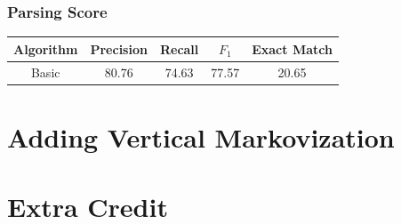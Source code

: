 \documentclass[12pt]{article}
\begin{document}
\subsubsection{Parsing Score}
\begin{center}
\begin{tabular}{|c|c|c|c|c|}
\hline
Algorithm & Precision & Recall & $F_1$ & Exact Match \\\hline
Basic & 80.76 & 74.63 & 77.57 & 20.65\\\hline

\end{tabular}
\end{center}

\section{Adding Vertical Markovization}

\section{Extra Credit}
\end{document}
